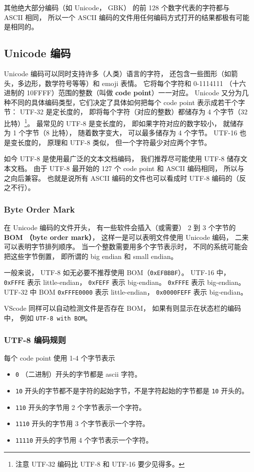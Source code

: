 其他绝大部分编码（如 Unicode， GBK） 的前 128 个数字代表的字符都与 ASCII 相同， 所以一个 ASCII 编码的文件用任何编码方式打开的结果都极有可能是相同的。

\subsection{Unicode 编码}
Unicode 编码可以同时支持许多（人类）语言的字符， 还包含一些图形（如箭头，多边形，数学符号等等）和 emoji 表情。 它将每个字符和 0-1114111 （十六进制的 10FFFF）范围的整数（叫做 \textbf{code point}）一一对应。 Unicode 又分为几种不同的具体编码类型，它们决定了具体如何把每个 code point 表示成若干个字节： UTF-32 是定长度的， 即将每个字符（对应的整数）都储存为 4 个字节（32 比特）\footnote{注意 UTF-32 编码比 UTF-8 和 UTF-16 要少见得多。}。 最常见的 UTF-8 是变长度的， 即如果字符对应的数字较小， 就储存为 1 个字节（8 比特）， 随着数字变大， 可以最多储存为 4 个字节。 UTF-16 也是变长度的， 原理和 UTF-8 类似， 但一个字符最少对应两个字节。

如今 UTF-8 是使用最广泛的文本文档编码， 我们推荐尽可能使用 UTF-8 储存文本文档。 由于 UTF-8 最开始的 127 个 code point 和 ASCII 编码相同， 所以与之向后兼容。 也就是说所有 ASCII 编码的文件也可以看成时 UTF-8 编码的（反之不行）。

\subsubsection{Byte Order Mark}
在 Unicode 编码的文件开头， 有一些软件会插入（或需要） 2 到 3 个字节的 \textbf{BOM （byte order mark）}， 这样一是可以表明文件使用 Unicode 编码， 二来可以表明字节排列顺序。 当一个整数需要用多个字节表示时， 不同的系统可能会把这些字节倒置， 即所谓的 big endian 和 small endian。

一般来说， UTF-8 如无必要不推荐使用 BOM（\verb`0xEFBBBF`）。 UTF-16 中， \verb`0xFFFE` 表示 little-endian， \verb`0xFEFF` 表示 big-endian。 \verb`0xFFFE` 表示 big-endian。 UTF-32 中 BOM \verb`0xFFFE0000` 表示 little-endian， \verb`0x0000FEFF` 表示 big-endian。

VScode 同样可以自动检测文件是否存在 BOM， 如果有则显示在状态栏的编码中， 例如 \verb`UTF-8 with BOM`。

\subsubsection{UTF-8 编码规则}
每个 code point 使用 1-4 个字节表示
\begin{itemize}
\item \verb`0` （二进制）开头的字节都是 ascii 字符。
\item \verb`10` 开头的字节都不是字符的起始字节，不是字符起始的字节都是 \verb`10` 开头的。
\item \verb`110` 开头的字节用 2 个字节表示一个字符。
\item \verb`1110` 开头的字节用 3 个字节表示一个字符。
\item \verb`11110` 开头的字节用 4 个字节表示一个字符。
\end{itemize}
